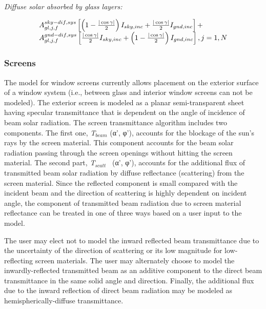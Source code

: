 \emph{Diffuse solar absorbed by glass layers:}

\begin{equation}
\begin{array}{l}A_{gl,j,f}^{sky - dif,sys}\left[ {\left( {1 - \frac{{|\cos \gamma |}}{2}} \right){I_{sky,inc}} + \frac{{|\cos \gamma |}}{2}{I_{gnd,inc}}} \right] + \\A_{gl,j,f}^{gnd - dif,sys}\left[ {\frac{{|\cos \gamma |}}{2}{I_{sky,inc}} + \left( {1 - \frac{{|\cos \gamma |}}{2}} \right){I_{gnd,inc}}} \right],{\rm{    }}j = 1,N\end{array}
\end{equation}

\subsubsection{Screens}\label{screens}

The model for window screens currently allows placement on the exterior surface of a window system (i.e., between glass and interior window screens can not be modeled). The exterior screen is modeled as a planar semi-transparent sheet having specular transmittance that is dependent on the angle of incidence of beam solar radiation. The screen transmittance algorithm includes two components. The first one, \emph{T\(_{beam}\)} (α', φ'), accounts for the blockage of the sun's rays by the screen material. This component accounts for the beam solar radiation passing through the screen openings without hitting the screen material. The second part, \emph{T\(_{scatt}\)}~ (α', φ'), accounts for the additional flux of transmitted beam solar radiation by diffuse reflectance (scattering) from the screen material. Since the reflected component is small compared with the incident beam and the direction of scattering is highly dependent on incident angle, the component of transmitted beam radiation due to screen material reflectance can be treated in one of three ways based on a user input to the model.

The user may elect not to model the inward reflected beam transmittance due to the uncertainty of the direction of scattering or its low magnitude for low-reflecting screen materials. The user may alternately choose to model the inwardly-reflected transmitted beam as an additive component to the direct beam transmittance in the same solid angle and direction. Finally, the additional flux due to the inward reflection of direct beam radiation may be modeled as hemispherically-diffuse transmittance.

